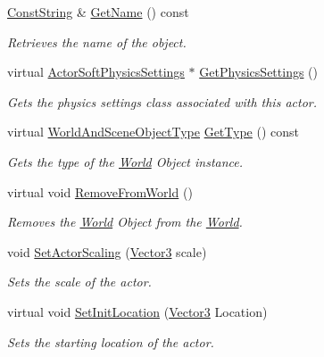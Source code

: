 \begin{DoxyCompactItemize}
\hyperlink{namespaceMezzanine_a63cd699ac54b73953f35ec9cfc05e506}{Const\-String} \& \hyperlink{classMezzanine_1_1ActorSoft_aa37860ec9b4d12111c74df7bd14fc58d}{Get\-Name} () const 
\begin{DoxyCompactList}\small\item\em Retrieves the name of the object. \end{DoxyCompactList}\item 
virtual \hyperlink{classMezzanine_1_1ActorSoftPhysicsSettings}{Actor\-Soft\-Physics\-Settings} $\ast$ \hyperlink{classMezzanine_1_1ActorSoft_a9d2960eee35ecfefe76fce2dde3ea18e}{Get\-Physics\-Settings} ()
\begin{DoxyCompactList}\small\item\em Gets the physics settings class associated with this actor. \end{DoxyCompactList}\item 
virtual \hyperlink{namespaceMezzanine_ae8cd04f706f4998be62f454b7119c718}{World\-And\-Scene\-Object\-Type} \hyperlink{classMezzanine_1_1ActorSoft_adddd9e4dafbe78aa9fb55ab92a42dc42}{Get\-Type} () const 
\begin{DoxyCompactList}\small\item\em Gets the type of the \hyperlink{classMezzanine_1_1World}{World} Object instance.  \end{DoxyCompactList}\item 
virtual void \hyperlink{classMezzanine_1_1ActorSoft_ac1c30677a8be15080ba7bbdbf7ce696e}{Remove\-From\-World} ()
\begin{DoxyCompactList}\small\item\em Removes the \hyperlink{classMezzanine_1_1World}{World} Object from the \hyperlink{classMezzanine_1_1World}{World}.  \end{DoxyCompactList}\item 
void \hyperlink{classMezzanine_1_1ActorSoft_ab76bcb0d227374ef5d69878783c7f89b}{Set\-Actor\-Scaling} (\hyperlink{classMezzanine_1_1Vector3}{Vector3} scale)
\begin{DoxyCompactList}\small\item\em Sets the scale of the actor. \end{DoxyCompactList}\item 
virtual void \hyperlink{classMezzanine_1_1ActorSoft_a45178fcaf06a81e75d7d81b8fc90fc9e}{Set\-Init\-Location} (\hyperlink{classMezzanine_1_1Vector3}{Vector3} Location)
\begin{DoxyCompactList}\small\item\em Sets the starting location of the actor. \end{DoxyCompactList}\item 

\end{DoxyCompactItemize}
